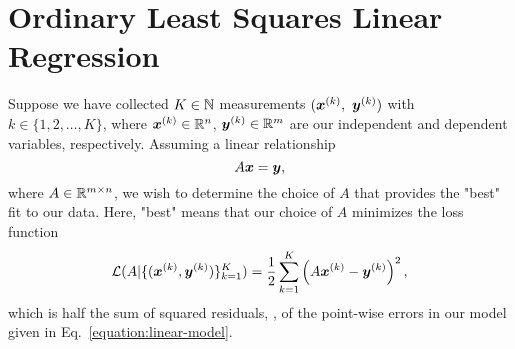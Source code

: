 \section{Ordinary Least Squares Linear Regression}
\label{section:ordinary-least-squares}
%
%
Suppose we have collected $K \in \mathbb{N}$ measurements $(\bm{x}^{(k)},~\bm{y}^{(k)})$ with $k \in \{1, 2, \dots, K\}$,
where $\bm{x}^{(k)} \in \mathbb{R}^n$, $\bm{y}^{(k)} \in \mathbb{R}^m$ are our independent and dependent variables, respectively.
Assuming a linear relationship
%
\begin{equation}
    \label{equation:linear-model}
    A \bm{x} = \bm{y},
\end{equation}
%
where $A \in \mathbb{R}^{m \times n}$, we wish to determine the choice of $A$ that provides the "best" fit to our data.
Here, "best" means that our choice of $A$ minimizes the loss function
%
\begin{equation}
    \mathcal{L}(A | \{(\bm{x}^{(k)}, \bm{y}^{(k)})\}_{k=1}^K) = \frac{1}{2} \sum_{k=1}^K \left( A \bm{x}^{(k)} - \bm{y}^{(k)} \right)^2,
\end{equation}
%
which is half the sum of squared residuals, \ie, of the point-wise errors in our model given in Eq.~\eqref{equation:linear-model}.

